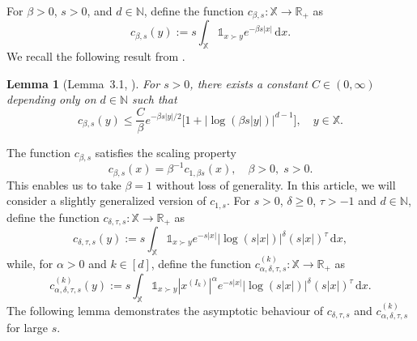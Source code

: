 \documentclass[11pt,reqno]{amsart}
\numberwithin{equation}{section}
\newtheorem{lemma}[theorem]{Lemma}
\theoremstyle{definition}
\newcommand{\R}{\mathbb{R}}
\newcommand{\N}{\mathbb{N}}
\newcommand{\XX}{\mathbb{X}}
\newcommand{\diff}{{\,\mathrm d}}
\begin{document}
For $\beta>0$, $s>0$, and $d\in\N$, define the function
$c_{\beta,s}: \XX \to \R_+$ as
\begin{equation}\label{eq:cdef}
c_{\beta,s} (y):=s\int_{\XX}\mathds{1}_{x\succ y}
e^{-\beta s |x|} \diff x.
\end{equation}
We recall the following result from \cite{BM21}.

\begin{lemma}[Lemma~3.1, \cite{BM21}]
	\label{lem:BM21}
	For $s>0$, there exists a constant $C\in (0,\infty)$ depending only on $d \in \N$ such that
	\begin{displaymath}
	c_{\beta,s}(y)\leq \frac{C}{\beta}
	e^{-\beta s|y|/2}\Big[1+\big|\log(\beta s|y|)\big|^{d-1}\Big], \quad y \in \XX.
	\end{displaymath}
\end{lemma}


The function $c_{\beta,s}$ satisfies the scaling property
\begin{equation*}
	c_{\beta,s}(x)=\beta^{-1} c_{1,\beta s}(x), \quad \beta>0,\; s>0.
\end{equation*}
This enables us to take $\beta=1$ without loss of 
generality.  In this article, we will consider a slightly generalized version of $c_{1,s}$. 
For $s >0$, $\delta \ge 0$, $\tau>-1$ and $d \in \N$, define the function $c_{\delta,
	\tau,s}: \XX \to \R_+$ as
\begin{equation}
	\label{eq:cal}
	c_{\delta,\tau,s} (y):=s\int_{\XX}\mathds{1}_{x\succ y}
	e^{-s |x|} \big|\log (s |x|) \big|^\delta (s|x|)^\tau \diff x,
\end{equation}
while, for $ \alpha >0$ and $k \in [d]$, define the function
$c_{\alpha,\delta,\tau, s}^{(k)}: \XX \to \R_+$ as
\begin{equation}
	\label{eq:cal'}
	c_{\alpha,\delta,\tau,s}^{(k)} (y):=s\int_{\XX} \mathds{1}_{x\succ y} |x^{(I_k)}|^\alpha
	e^{-s |x|} \big|\log (s |x|) \big|^\delta (s |x|)^\tau \diff x.
\end{equation}
The following lemma demonstrates the asymptotic behaviour
of $c_{\delta,\tau,s}$ and $c_{\alpha,\delta,\tau,s}^{(k)}$ for large $s$. 
\end{document}
